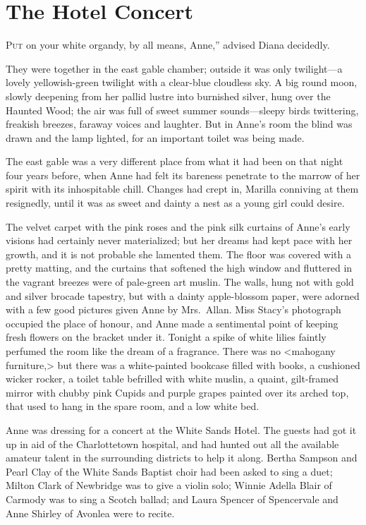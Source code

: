 \chapter{The Hotel Concert}

\lettrine[ante=“,]{P}{ut} on your white organdy, by all means, Anne,” advised Diana decidedly.

\zz
They were together in the east gable chamber; outside it was only twilight—a lovely yellowish-green twilight with a clear-blue cloudless sky. A big round moon, slowly deepening from her pallid lustre into burnished silver, hung over the Haunted Wood; the air was full of sweet summer sounds—sleepy birds twittering, freakish breezes, faraway voices and laughter. But in Anne's room the blind was drawn and the lamp lighted, for an important toilet was being made.

The east gable was a very different place from what it had been on that night four years before, when Anne had felt its bareness penetrate to the marrow of her spirit with its inhospitable chill. Changes had crept in, Marilla conniving at them resignedly, until it was as sweet and dainty a nest as a young girl could desire.

The velvet carpet with the pink roses and the pink silk curtains of Anne's early visions had certainly never materialized; but her dreams had kept pace with her growth, and it is not probable she lamented them. The floor was covered with a pretty matting, and the curtains that softened the high window and fluttered in the vagrant breezes were of pale-green art muslin. The walls, hung not with gold and silver brocade tapestry, but with a dainty apple-blossom paper, were adorned with a few good pictures given Anne by Mrs.~Allan. Miss Stacy's photograph occupied the place of honour, and Anne made a sentimental point of keeping fresh flowers on the bracket under it. Tonight a spike of white lilies faintly perfumed the room like the dream of a fragrance. There was no <mahogany furniture,> but there was a white-painted bookcase filled with books, a cushioned wicker rocker, a toilet table befrilled with white muslin, a quaint, gilt-framed mirror with chubby pink Cupids and purple grapes painted over its arched top, that used to hang in the spare room, and a low white bed.

Anne was dressing for a concert at the White Sands Hotel. The guests had got it up in aid of the Charlottetown hospital, and had hunted out all the available amateur talent in the surrounding districts to help it along. Bertha Sampson and Pearl Clay of the White Sands Baptist choir had been asked to sing a duet; Milton Clark of Newbridge was to give a violin solo; Winnie Adella Blair of Carmody was to sing a Scotch ballad; and Laura Spencer of Spencervale and Anne Shirley of Avonlea were to recite.

